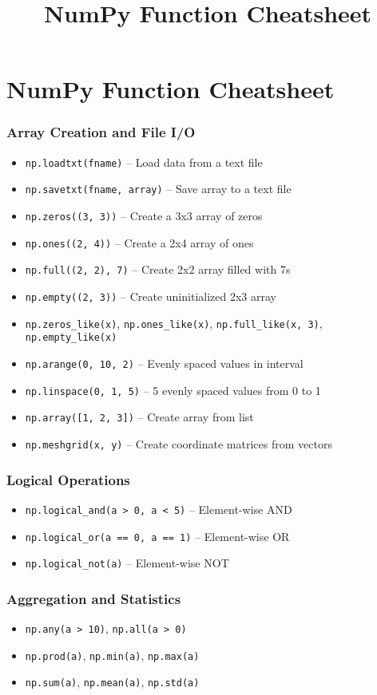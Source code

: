 \documentclass{article}
\title{NumPy Function Cheatsheet}
\author{}
\date{}
\begin{document}
\scriptsize

\section*{NumPy Function Cheatsheet}

\subsubsection*{Array Creation and File I/O}
\begin{itemize}
    \item \texttt{np.loadtxt(fname)} -- Load data from a text file
    \item \texttt{np.savetxt(fname, array)} -- Save array to a text file
    \item \texttt{np.zeros((3, 3))} -- Create a 3x3 array of zeros
    \item \texttt{np.ones((2, 4))} -- Create a 2x4 array of ones
    \item \texttt{np.full((2, 2), 7)} -- Create 2x2 array filled with 7s
    \item \texttt{np.empty((2, 3))} -- Create uninitialized 2x3 array
    \item \texttt{np.zeros\_like(x)}, \texttt{np.ones\_like(x)}, \texttt{np.full\_like(x, 3)}, \texttt{np.empty\_like(x)}
    \item \texttt{np.arange(0, 10, 2)} -- Evenly spaced values in interval
    \item \texttt{np.linspace(0, 1, 5)} -- 5 evenly spaced values from 0 to 1
    \item \texttt{np.array([1, 2, 3])} -- Create array from list
    \item \texttt{np.meshgrid(x, y)} -- Create coordinate matrices from vectors
\end{itemize}

\subsubsection*{Logical Operations}
\begin{itemize}
    \item \texttt{np.logical\_and(a > 0, a < 5)} -- Element-wise AND
    \item \texttt{np.logical\_or(a == 0, a == 1)} -- Element-wise OR
    \item \texttt{np.logical\_not(a)} -- Element-wise NOT
\end{itemize}

\subsubsection*{Aggregation and Statistics}
\begin{itemize}
    \item \texttt{np.any(a > 10)}, \texttt{np.all(a > 0)}
    \item \texttt{np.prod(a)}, \texttt{np.min(a)}, \texttt{np.max(a)}
    \item \texttt{np.sum(a)}, \texttt{np.mean(a)}, \texttt{np.std(a)}
\end{itemize}
\end{document}

